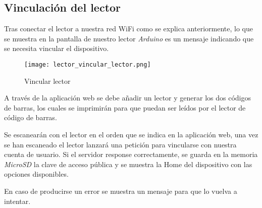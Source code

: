 \subsection{Vinculación del lector}

Tras conectar el lector a nuestra red WiFi como se explica anteriormente, lo que se muestra en la pantalla de nuestro lector \emph{Arduino} es un mensaje indicando que se necesita vincular el dispositivo.

\begin{figure}[H]
    \centering
    \texttt{[image: lector\_vincular\_lector.png]}
    \caption{Vincular lector}\label{fig:lector_vincular_lector_1}
\end{figure}


A través de la aplicación web se debe añadir un lector y generar los dos códigos de barras, los cuales se imprimirán para que puedan ser leídos por el lector de código de barras.

Se escanearán con el lector en el orden que se indica en la aplicación web, una vez se han escaneado el lector lanzará una petición para vincularse con nuestra cuenta de usuario. Si el servidor response correctamente, se guarda en la memoria \emph{MicroSD} la clave de acceso pública y se muestra la Home del dispositivo con las opciones disponibles.

En caso de producirse un error se muestra un mensaje para que lo vuelva a intentar.